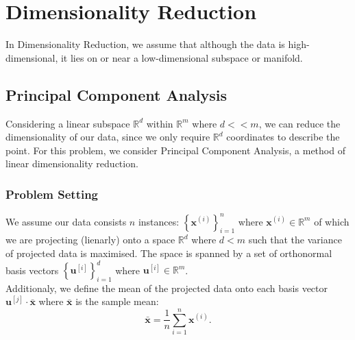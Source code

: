 \section{Dimensionality Reduction}
In Dimensionality Reduction, we assume that although the data is
high-dimensional, it lies on or near a low-dimensional subspace or manifold.
\subsection{Principal Component Analysis}
Considering a linear subspace $\mathbb{R}^{d}$ within $\mathbb{R}^{m}$ where
$d<<m$, we can reduce the dimensionality of our data, since we only require
$\mathbb{R}^{d}$ coordinates to describe the point. For this problem, we
consider Principal Component Analysis, a method of linear dimensionality
reduction.
\subsubsection{Problem Setting}
We assume our data consists $n$ instances: ${\left\{ \mathbf{x}^{(i)}
\right\}}_{i=1}^{n}$ where $\mathbf{x}^{(i)}\in \mathbb{R}^{m}$ of which we are
projecting (lienarly) onto a space $\mathbb{R}^{d}$ where $d<m$ such that the
variance of projected data is maximised. The space is spanned by a set of
orthonormal basis vectors ${\left\{ \mathbf{u}^{[i]} \right\}}^{d}_{i=1}$ where
$\mathbf{u}^{[i]}\in \mathbb{R}^{m}$.\\
Additionaly, we define the mean of the projected data onto each
basis vector $\mathbf{u}^{[j]}\cdot\bar{\mathbf{x}}$ where $\bar{\mathbf{x}}$ is the
sample mean:
\[\bar{\mathbf{x}}=\frac{1}{n}\sum_{i=1}^{n} \mathbf{x}^{(i)}.\]
